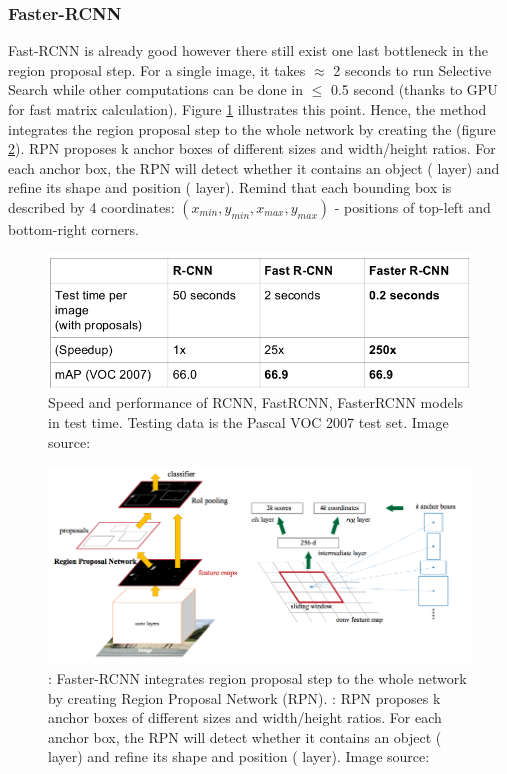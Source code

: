 \subsubsection{Faster-RCNN}
Fast-RCNN is already good however there still exist one last bottleneck in the region proposal step. For a single image, it takes $\approx$ 2 seconds to run Selective Search while other computations can be done in $\leq$ 0.5 second (thanks to GPU for fast matrix calculation). Figure \ref{fig:rcnnCompair} illustrates this point. Hence, the  method \cite{DBLP:journals/corr/RenHG015} integrates the region proposal step to the whole network by creating the   (figure \ref{fig:fasterRCNNfull}). RPN proposes k anchor boxes of different sizes and width/height ratios. For each anchor box, the RPN will detect whether it contains an object ( layer) and refine its shape and position ( layer). Remind that each bounding box is described by 4 coordinates: $(x_{min}, y_{min}, x_{max}, y_{max})$ - positions of top-left and bottom-right corners.

\begin{figure}[tb]
	\centering
	\includegraphics[width=0.8\hsize]{./figures/rcnnCompair}
	\caption{Speed and performance of RCNN, FastRCNN, FasterRCNN models in test time. Testing data is the Pascal VOC 2007 test set. Image source: \cite{cs231n}}
	\label{fig:rcnnCompair}
\end{figure}

\begin{figure}[tb]
	\centering
	\includegraphics[width=1.0\hsize]{./figures/fasterRCNNfull}
	\caption{: Faster-RCNN integrates region proposal step to the whole network by creating Region Proposal Network (RPN). : RPN proposes k anchor boxes of different sizes and width/height ratios. For each anchor box, the RPN will detect whether it contains an object ( layer) and refine its shape and position ( layer). Image source: \cite{DBLP:journals/corr/RenHG015}}
	\label{fig:fasterRCNNfull}
\end{figure}

